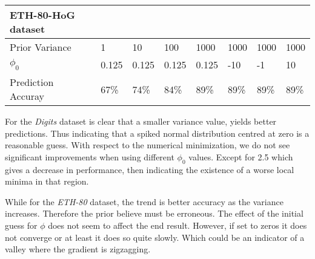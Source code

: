 \documentclass[12pt]{article}
\begin{document}
\begin{table}[h]
\begin{tabular}{l|lllllll}
ETH-80-HoG dataset &  &  &  &  &  &  &  \\ \hline
Prior Variance & \multicolumn{1}{l|}{1} & \multicolumn{1}{l|}{10} & \multicolumn{1}{l|}{100} & \multicolumn{1}{l|}{1000} & \multicolumn{1}{l|}{1000} & \multicolumn{1}{l|}{1000} & \multicolumn{1}{l|}{1000} \\ \hline
$\phi_{0}$ & \multicolumn{1}{l|}{0.125} & \multicolumn{1}{l|}{0.125} & \multicolumn{1}{l|}{0.125} & \multicolumn{1}{l|}{0.125} & \multicolumn{1}{l|}{-10} & \multicolumn{1}{l|}{-1} & \multicolumn{1}{l|}{10} \\ \hline
Prediction Accuray & \multicolumn{1}{l|}{67\%} & \multicolumn{1}{l|}{74\%} & \multicolumn{1}{l|}{84\%} & \multicolumn{1}{l|}{89\%} & \multicolumn{1}{l|}{89\%} & \multicolumn{1}{l|}{89\%} & \multicolumn{1}{l|}{89\%} \\ \hline
\end{tabular}
\end{table}

For the \textit{Digits} dataset is clear that a smaller variance value, yields better predictions.
Thus indicating that a spiked normal distribution centred at zero is a reasonable guess.
With respect to the numerical minimization, we do not see significant improvements when using different $\phi_{0}$ values. 
Except for 2.5 which gives a decrease in performance, then indicating the existence of a worse local minima in that region.

While for the \textit{ETH-80} dataset, the trend is better accuracy as the variance increases.
Therefore the prior believe must be erroneous.
The effect of the initial guess for $\phi$ does not seem to affect the end result.
However, if set to zeros it does not converge or at least it does so quite slowly.
Which could be an indicator of a valley where the gradient is zigzagging.
 
\end{document}
